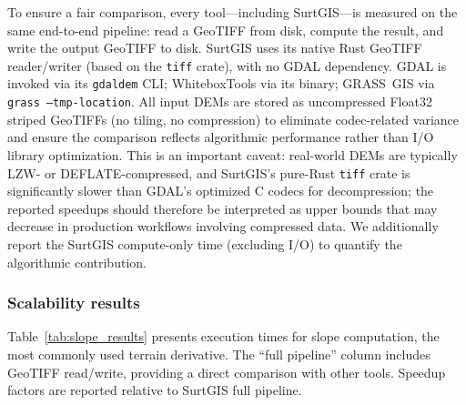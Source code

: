 \documentclass[preprint,review,12pt,authoryear]{elsarticle}
\begin{document}
To ensure a fair comparison, every tool---including SurtGIS---is measured on the same end-to-end pipeline: read a GeoTIFF from disk, compute the result, and write the output GeoTIFF to disk. SurtGIS uses its native Rust GeoTIFF reader/writer (based on the \texttt{tiff} crate), with no GDAL dependency. GDAL is invoked via its \texttt{gdaldem} CLI; WhiteboxTools via its binary; GRASS~GIS via \texttt{grass --tmp-location}. All input DEMs are stored as uncompressed Float32 striped GeoTIFFs (no tiling, no compression) to eliminate codec-related variance and ensure the comparison reflects algorithmic performance rather than I/O library optimization. This is an important caveat: real-world DEMs are typically LZW- or DEFLATE-compressed, and SurtGIS's pure-Rust \texttt{tiff} crate is significantly slower than GDAL's optimized C codecs for decompression; the reported speedups should therefore be interpreted as upper bounds that may decrease in production workflows involving compressed data. We additionally report the SurtGIS compute-only time (excluding I/O) to quantify the algorithmic contribution.

\subsubsection{Scalability results}

Table~\ref{tab:slope_results} presents execution times for slope computation, the most commonly used terrain derivative. The ``full pipeline'' column includes GeoTIFF read/write, providing a direct comparison with other tools. Speedup factors are reported relative to SurtGIS full pipeline.
\end{document}
